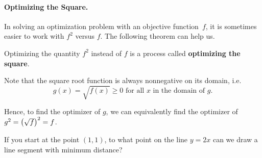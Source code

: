 \documentclass[12pt]{article}
\begin{document}
\paragraph{Optimizing the Square.} In solving an optimization problem with an objective function~$f$, it is sometimes easier to work with $f^2$ versus $f$. The following theorem can help us.

\vspace{5mm}


\vspace{5mm}

Optimizing the quantity $f^2$ instead of $f$ is a process called \textbf{optimizing the square}.

\vspace{5mm}

Note that the square root function is always nonnegative on its domain, i.e.
$$g(x)=\sqrt{f(x)}\geq 0 \text{ for all $x$ in the domain of }g.$$

Hence, to find the optimizer of $g$, we can equivalently find the optimizer of $g^2=\left(\sqrt{f}\right)^2=f$.

\newpage

\Example If you start at the point $(1,1)$, to what point on the line $y=2x$ can we draw a line segment with minimum distance?
\end{document}

